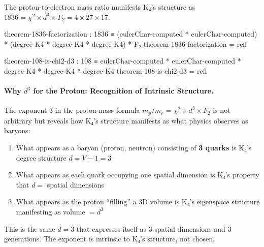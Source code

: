 \documentclass[11pt,a4paper]{book}
\begin{document}
The proton-to-electron mass ratio manifests K₄'s structure as $1836 = \chi^2 \times d^3 \times F_2 = 4 \times 27 \times 17$.

\begin{code}
theorem-1836-factorization : 1836 ≡ (eulerChar-computed * eulerChar-computed) * (degree-K4 * degree-K4 * degree-K4) * F₂
theorem-1836-factorization = refl

theorem-108-is-chi2-d3 : 108 ≡ eulerChar-computed * eulerChar-computed * degree-K4 * degree-K4 * degree-K4
theorem-108-is-chi2-d3 = refl
\end{code}

\paragraph{Why $d^3$ for the Proton: Recognition of Intrinsic Structure.}

The exponent 3 in the proton mass formula $m_p/m_e = \chi^2 \times d^3 \times F_2$ is not 
arbitrary but reveals how K₄'s structure manifests as what physics observes as baryons:

\begin{enumerate}
\item What appears as a baryon (proton, neutron) consisting of \textbf{3 quarks} is K₄'s degree structure $d = V - 1 = 3$
\item What appears as each quark occupying one spatial dimension is K₄'s property that $d = $ spatial dimensions
\item What appears as the proton ``filling'' a 3D volume is K₄'s eigenspace structure manifesting as volume $= d^3$
\end{enumerate}

This is the same $d = 3$ that expresses itself as 3 spatial dimensions and 3 generations. The 
exponent is intrinsic to K₄'s structure, not chosen.
\end{document}
